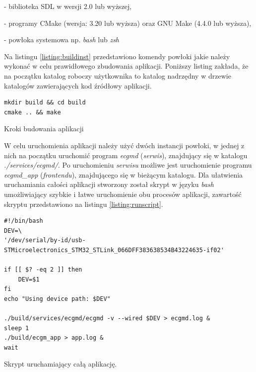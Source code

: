 - biblioteka SDL w wersji 2.0 lub wyższej,

- programy CMake (wersja: 3.20 lub wyższa) oraz GNU Make (4.4.0 lub wyższa),

- powłoka systemowa np. \textit{bash} lub \textit{zsh}

Na listingu \ref{listing:buildinst} przedstawiono komendy powłoki jakie należy wykonać w celu prawidłowego
zbudowania aplikacji. Poniższy listing zakłada, że na początku katalog roboczy użytkownika to katalog 
nadrzędny w drzewie katalogów zawierających kod źródłowy aplikacji.

\begin{listing}
\begin{verbatim}
mkdir build && cd build
cmake .. && make
\end{verbatim}
    \caption{Kroki budowania aplikacji}
\label{listing:buildinst}
\end{listing}

W celu uruchomienia aplikacji należy użyć dwóch instancji powłoki, w jednej z nich na początku uruchomić program
\textit{ecgmd} (\textit{serwis}), znajdujący się w katalogu \textit{./services/ecgmd/}.
Po uruchomieniu \textit{serwisu} możliwe jest uruchomienie programu \textit{ecgmd\_app} (\textit{frontendu}), znajdującego
się w bieżącym katalogu. Dla ułatwienia uruchamiania całości aplikacji stworzony został 
skrypt w języku \textit{bash} umożliwiający szybkie i łatwe uruchomienie obu procesów aplikacji, 
zawartość skryptu przedstawiono na listingu \ref{listing:runscript}.

\begin{listing}
\begin{verbatim}
#!/bin/bash
DEV=\
'/dev/serial/by-id/usb-STMicroelectronics_STM32_STLink_066DFF383638534B43224635-if02'

if [[ $? -eq 2 ]] then
    DEV=$1 
fi
echo "Using device path: $DEV"

./build/services/ecgmd/ecgmd -v --wired $DEV > ecgmd.log &
sleep 1
./build/ecgm_app > app.log &
wait
\end{verbatim}
    \caption{Skrypt uruchamiający całą aplikację.}
\label{listing:runscript}
\end{listing}
